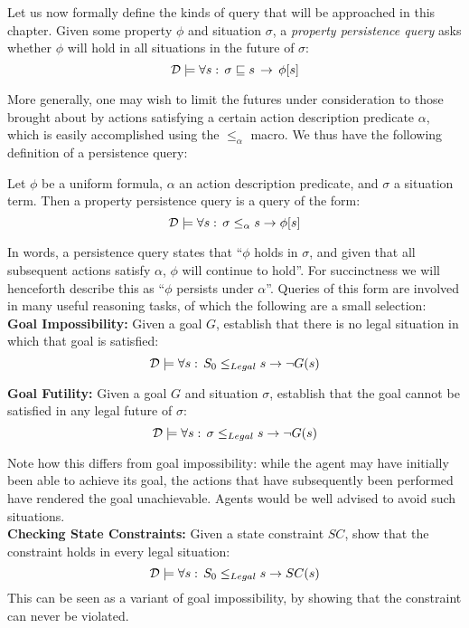 Let us now formally define the kinds of query that will be approached
in this chapter. Given some property $\phi$ and situation $\sigma$,
a \emph{property persistence query} asks whether $\phi$ will hold
in all situations in the future of $\sigma$: \[
\mathcal{D}\models\forall s:\,\sigma\sqsubseteq s\,\rightarrow\,\phi[s]\]


More generally, one may wish to limit the futures under consideration
to those brought about by actions satisfying a certain action description
predicate $\alpha$, which is easily accomplished using the $\leq_{\alpha}$
macro. We thus have the following definition of a persistence query:

\begin{defnL}
 Let $\phi$ be a uniform
formula, $\alpha$ an action description predicate, and $\sigma$
a situation term. Then a property persistence query is a query of
the form:\[
\mathcal{D}\models\forall s:\,\sigma\le_{\alpha}s\rightarrow\phi[s]\]

\end{defnL}
In words, a persistence query states that {}``$\phi$ holds in $\sigma$,
and given that all subsequent actions satisfy $\alpha$, $\phi$ will
continue to hold''. For succinctness we will henceforth describe
this as {}``$\phi$ persists under $\alpha$''. Queries of this
form are involved in many useful reasoning tasks, of which the following
are a small selection:\\


\textbf{Goal Impossibility:} Given a goal $G$, establish that there
is no legal situation in which that goal is satisfied:\[
\mathcal{D}\models\forall s:\, S_{0}\leq_{Legal}s\rightarrow\neg G(s)\]
 

\textbf{Goal Futility:} Given a goal $G$ and situation $\sigma$,
establish that the goal cannot be satisfied in any legal future of
$\sigma$:\[
\mathcal{D}\models\forall s:\,\sigma\leq_{Legal}s\rightarrow\neg G(s)\]


Note how this differs from goal impossibility: while the agent may
have initially been able to achieve its goal, the actions that have
subsequently been performed have rendered the goal unachievable. Agents
would be well advised to avoid such situations.\\


\textbf{Checking State Constraints:} Given a state constraint $SC$,
show that the constraint holds in every legal situation:\[
\mathcal{D}\models\forall s:\, S_{0}\leq_{Legal}s\rightarrow SC(s)\]
 This can be seen as a variant of goal impossibility, by showing that
the constraint can never be violated.\\


